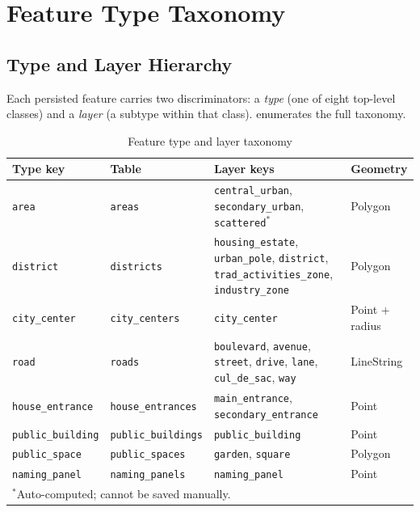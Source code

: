 \documentclass[12pt,a4paper]{article}
\theoremstyle{definition}
\theoremstyle{plain}
\theoremstyle{remark}
\begin{document}
\section{Feature Type Taxonomy}
\label{sec:feature_types}

\subsection{Type and Layer Hierarchy}

Each persisted feature carries two discriminators: a \emph{type} (one of
eight top-level classes) and a \emph{layer} (a subtype within that class).
 enumerates the full taxonomy.

\begin{table}[H]
\centering
\caption{Feature type and layer taxonomy}
\label{tab:feature_types}
\begin{tabularx}{\textwidth}{ll>{\raggedright\arraybackslash}Xl}
\toprule
\textbf{Type key} & \textbf{Table} & \textbf{Layer keys} & \textbf{Geometry} \\
\midrule
\texttt{area} & \texttt{areas} &
  \texttt{central\_urban}, \texttt{secondary\_urban}, \texttt{scattered}$^*$
  & Polygon \\
\texttt{district} & \texttt{districts} &
  \texttt{housing\_estate}, \texttt{urban\_pole}, \texttt{district},
  \texttt{trad\_activities\_zone}, \texttt{industry\_zone}
  & Polygon \\
\texttt{city\_center} & \texttt{city\_centers} &
  \texttt{city\_center} & Point + radius \\
\texttt{road} & \texttt{roads} &
  \texttt{boulevard}, \texttt{avenue}, \texttt{street}, \texttt{drive},
  \texttt{lane}, \texttt{cul\_de\_sac}, \texttt{way}
  & LineString \\
\texttt{house\_entrance} & \texttt{house\_entrances} &
  \texttt{main\_entrance}, \texttt{secondary\_entrance} & Point \\
\texttt{public\_building} & \texttt{public\_buildings} &
  \texttt{public\_building} & Point \\
\texttt{public\_space} & \texttt{public\_spaces} &
  \texttt{garden}, \texttt{square} & Polygon \\
\texttt{naming\_panel} & \texttt{naming\_panels} &
  \texttt{naming\_panel} & Point \\
\bottomrule
\multicolumn{4}{l}{$^*$Auto-computed; cannot be saved manually.}
\end{tabularx}
\end{table}
\end{document}
